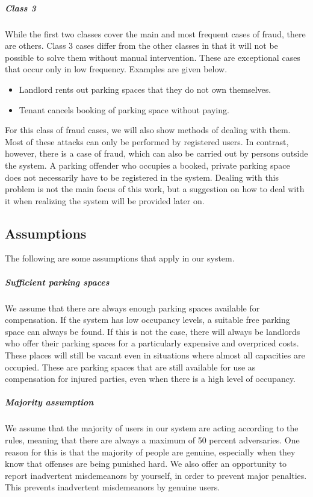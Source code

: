 \documentclass[
a4paper,     %
titlepage,   %
14pt         %
]{scrartcl}  %
\theoremstyle{mystyle}
\begin{document}
\subparagraph{Class 3} While the first two classes cover the main and most frequent cases of fraud, there are others. Class 3 cases differ from the other classes in that it will not be possible to solve them without manual intervention. These are exceptional cases that occur only in low frequency. Examples are given below.
\begin{itemize}
\item Landlord rents out parking spaces that they do not own themselves.
\item Tenant cancels booking of parking space without paying.
\end{itemize}
For this class of fraud cases, we will also show methods of dealing with them.\\

Most of these attacks can only be performed by registered users. In contrast, however, there is a case of fraud, which can also be carried out by persons outside the system. A parking offender who occupies a booked, private parking space does not necessarily have to be registered in the system. Dealing with this problem is not the main focus of this work, but a suggestion on how to deal with it when realizing the system will be provided later on.

\subsection{Assumptions}
The following are some assumptions that apply in our system.\\

\subparagraph{Sufficient parking spaces} We assume that there are always enough parking spaces available for compensation. If the system has low occupancy levels, a suitable free parking space can always be found. If this is not the case, there will always be landlords  who offer their parking spaces for a particularly expensive and overpriced costs. These places will still be vacant even in situations where almost all capacities are occupied. These are parking spaces that are still available for use as compensation for injured parties, even when there is a high level of occupancy. 

\subparagraph{Majority assumption} We assume that the majority of users in our system are acting according to the rules, meaning that there are always a maximum of 50 percent adversaries. One reason for this is that the majority of people are genuine, especially when they know that offenses are being punished hard. We also offer an opportunity to report inadvertent misdemeanors by yourself, in order to prevent major penalties. This prevents inadvertent misdemeanors by genuine users.\\
\end{document}
